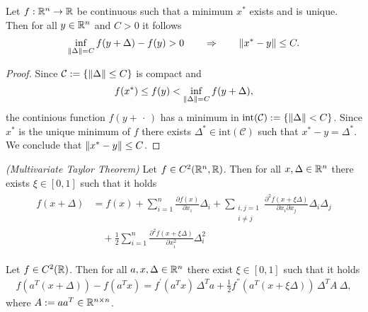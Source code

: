 \begin{proposition}
  \label{syu_1_result}
  Let 
  $f : \mathbb{R}^n \to \mathbb{R}$ 
  be continuous such that 
  a minimum $x^*$ exists and is unique.
  Then 
  for all $y \in \mathbb{R}^n$ and $C>0$ 
  it follows
    \begin{gather}
      \inf_{\left\lVert\Delta\right\rVert=C} f(y+\Delta) - f(y) > 0 \qquad
      \Rightarrow \qquad 
      \left\lVert x^* - y\right\rVert \le C.
    \end{gather}
\end{proposition}


\begin{proof}
Since 
$\mathcal{C}:=\left\{ \left\lVert\Delta\right\rVert\le C \right\}$
is compact and
\begin{gather*}
  f(x^*) \le f(y) <  \inf_{\left\lVert\Delta\right\rVert=C} f(y+\Delta),
\end{gather*}
the continious function $f(y+\,\cdot\,)$ has a minimum in 
$\text{int}(\mathcal{C}):=\left\{ \left\lVert\Delta\right\rVert < C \right\}$. 
Since 
$x^*$ is the unique minimum of $f$
there exists $\Delta^* \in \text{int}(\mathcal{C})$ 
such that 
$x^* - y = \Delta^*$.
We conclude that
$\left\lVert x^* - y\right\rVert \le C$.
\end{proof}



\begin{theorem}
  \emph{(Multivariate Taylor Theorem)}
  Let 
  $f \in C^2(\mathbb{R}^n, \mathbb{R})$.
  Then 
  for all $x, \Delta \in \mathbb{R}^n$
  there exists $\xi \in [0,1]$
  such that 
  it holds
  \begin{align}
    \label{syu_taylor}
    \begin{split}
    f(x + \Delta)
    &=
    f(x)
    +
    \sum_{i = 1}^{n} \frac{\partial f(x)}{\partial x_i} \Delta_i    
    + 
    \sum_{
    \begin{smallmatrix}
      i,j = 1 \\ 
      i \neq j
    \end{smallmatrix}
    }
    \frac{\partial^2 f(x + \xi \Delta)}{\partial x_i \partial x_j} \Delta_i\Delta_j
    \\
    & \quad+ 
    \frac{1}{2}\sum_{i = 1}^{n} \frac{\partial^2 f(x + \xi \Delta)}{\partial x_i^2}\Delta_i^2 
    \end{split}
  \end{align}
\end{theorem}


\begin{corollary}
  \label{syu_taylor_corollary}
  Let 
  $f\in C^2(\mathbb{R})$. 
  Then
  for all $a,x,\Delta \in \mathbb{R}^n$ 
  there exist $\xi \in [0,1]$ 
  such that it holds
  \begin{gather}
    \label{syu_2.result}
    f(a^T (x + \Delta)) - f(a^T x) = 
    f^{'}(a^T x)\, \Delta^T a + 
    \frac{1}{2}f^{''}(a^T (x + \xi \Delta))\, \Delta^T A\ \Delta,
  \end{gather}
  where 
  $A:= a a^T \in \mathbb{R}^{n \times n}$.
\end{corollary}

